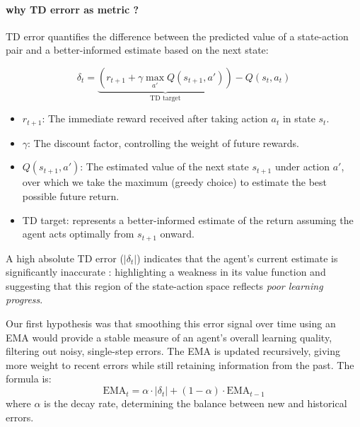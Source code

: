 \paragraph{why \ac{TD} errorr as metric  ?} 
TD error quantifies the difference between the predicted value of a state-action pair and a better-informed estimate based on the next state:

\begin{equation}
    \delta_t = 
    \underbrace{\left(r_{t+1} + \gamma \max_{a'} Q(s_{t+1}, a')\right)}_{\text{TD target}} 
    - Q(s_t, a_t)
    \label{eq:td_error}
\end{equation}

\begin{itemize}
    \item $r_{t+1}$: The immediate reward received after taking action $a_t$ in state $s_t$.
    \item $\gamma$: The discount factor, controlling the weight of future rewards.
    \item $Q(s_{t+1}, a')$: The estimated value of the next state $s_{t+1}$ under action $a'$, over which we take the maximum (greedy choice) to estimate the best possible future return.
    \item TD target: represents a better-informed estimate of the return assuming the agent acts optimally from $s_{t+1}$ onward.

\end{itemize}

A high absolute TD error ($|\delta_t|$) indicates that the agent's current estimate is significantly inaccurate : highlighting a weakness in its value function and suggesting that this region of the state-action space reflects \textit{poor learning progress}.



Our first hypothesis was that smoothing this error signal over time using an \ac{EMA} would provide a stable measure of an agent's overall learning quality, filtering out noisy, single-step errors. The \ac{EMA} is updated recursively, giving more weight to recent errors while still retaining information from the past. The formula is:
\begin{equation}
    \text{EMA}_t = \alpha \cdot |\delta_t| + (1 - \alpha) \cdot \text{EMA}_{t-1}
    \label{eq:ema}
\end{equation}
where $\alpha$ is the decay rate, determining the balance between new and historical errors.

